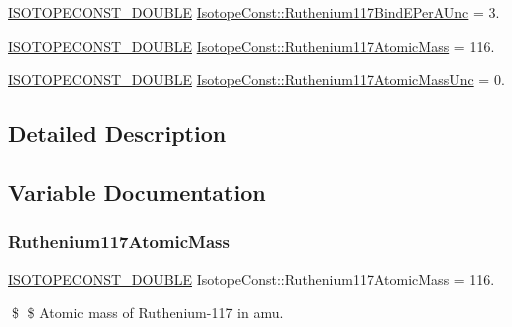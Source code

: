 \begin{DoxyCompactItemize}
\mbox{\hyperlink{group___isotope_const-_macros_ga8f45a7272ce02c0b4c65c44636ed719a}{I\+S\+O\+T\+O\+P\+E\+C\+O\+N\+S\+T\+\_\+\+D\+O\+U\+B\+LE}} \mbox{\hyperlink{group___isotope_const-_ruthenium-_ru117_ga77a5dbd98e3e27c7be469aa233de7706}{Isotope\+Const\+::\+Ruthenium117\+Bind\+E\+Per\+A\+Unc}} = 3.
\item 
\mbox{\hyperlink{group___isotope_const-_macros_ga8f45a7272ce02c0b4c65c44636ed719a}{I\+S\+O\+T\+O\+P\+E\+C\+O\+N\+S\+T\+\_\+\+D\+O\+U\+B\+LE}} \mbox{\hyperlink{group___isotope_const-_ruthenium-_ru117_gaa29dfe503eec8beee784a5c1b3332ba0}{Isotope\+Const\+::\+Ruthenium117\+Atomic\+Mass}} = 116.
\item 
\mbox{\hyperlink{group___isotope_const-_macros_ga8f45a7272ce02c0b4c65c44636ed719a}{I\+S\+O\+T\+O\+P\+E\+C\+O\+N\+S\+T\+\_\+\+D\+O\+U\+B\+LE}} \mbox{\hyperlink{group___isotope_const-_ruthenium-_ru117_ga9c9fcb193876eba248ec770593e361c1}{Isotope\+Const\+::\+Ruthenium117\+Atomic\+Mass\+Unc}} = 0.
\end{DoxyCompactItemize}


\subsection{Detailed Description}


\subsection{Variable Documentation}
\mbox{\label{group___isotope_const-_ruthenium-_ru117_gaa29dfe503eec8beee784a5c1b3332ba0}} 
\subsubsection{\texorpdfstring{Ruthenium117\+Atomic\+Mass}{Ruthenium117AtomicMass}}
{\footnotesize\ttfamily \mbox{\hyperlink{group___isotope_const-_macros_ga8f45a7272ce02c0b4c65c44636ed719a}{I\+S\+O\+T\+O\+P\+E\+C\+O\+N\+S\+T\+\_\+\+D\+O\+U\+B\+LE}} Isotope\+Const\+::\+Ruthenium117\+Atomic\+Mass = 116.}

\$ \$ Atomic mass of Ruthenium-\/117 in amu. \mbox{\label{group___isotope_const-_ruthenium-_ru117_ga9c9fcb193876eba248ec770593e361c1}} 
